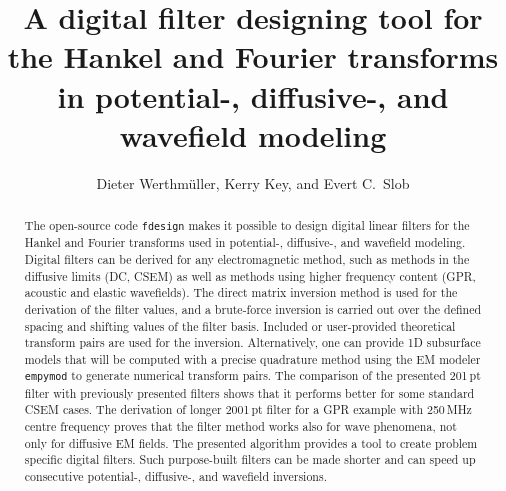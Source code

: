 \documentclass[paper,twocolumn,twoside]{geophysics}
\begin{document}
\title{A digital filter designing tool for the Hankel and Fourier transforms in
potential-, diffusive-, and wavefield modeling}

\renewcommand{\thefootnote}{\fnsymbol{footnote}}


\address{
\footnotemark[1]Instituto Mexicano del Petróleo,
Eje Central Lázaro Cárdenas Norte 152,
Col. San Bartolo Atepehuacan C.P. 07730,
Ciudad de México, México,
E-mail: \href{mailto:dieter@werthmuller.org}{Dieter@Werthmuller.org};
\footnotemark[2]Lamont-Doherty Earth Observatory,
305C Oceanography,
61 Route 9W, PO Box 1000,
Palisades NY 10964-8000 US,
E-mail: \href{mailto:KKey@ldeo.columbia.edu}{KKey@ldeo.columbia.edu};
\footnotemark[3]TU Delft,
Building 23,
Stevinweg 1 / PO-box 5048,
2628 CN Delft,
E-mail: \href{mailto:E.C.Slob@tudelft.nl}{E.C.Slob@tudelft.nl}.}


\author{%
Dieter Werthmüller\footnotemark[1], %
Kerry Key\footnotemark[2], and %
Evert C.\ Slob\footnotemark[3]%
}

\footer{}

\maketitle

\begin{abstract} %
%
  The open-source code \texttt{fdesign} makes it possible to design digital
  linear filters for the Hankel and Fourier transforms used in potential-,
  diffusive-, and wavefield modeling. Digital filters can be derived for any
  electromagnetic method, such as methods in the diffusive limits (DC, CSEM) as
  well as methods using higher frequency content (GPR, acoustic and elastic
  wavefields).
%
  The direct matrix inversion method is used for the derivation of the filter
  values, and a brute-force inversion is carried out over the defined spacing
  and shifting values of the filter basis. Included or user-provided
  theoretical transform pairs are used for the inversion. Alternatively, one
  can provide 1D subsurface models that will be computed with a precise
  quadrature method using the EM modeler \texttt{empymod} to generate
  numerical transform pairs.
%
  The comparison of the presented 201\,pt filter with previously presented
  filters shows that it performs better for some standard CSEM cases. The
  derivation of longer 2001\,pt filter for a GPR example with 250\,MHz centre
  frequency proves that the filter method works also for wave phenomena, not
  only for diffusive EM fields.
%
  The presented algorithm provides a tool to create problem specific digital
  filters. Such purpose-built filters can be made shorter and can speed up
  consecutive  potential-, diffusive-, and wavefield inversions.
%
\end{abstract}
\end{document}
